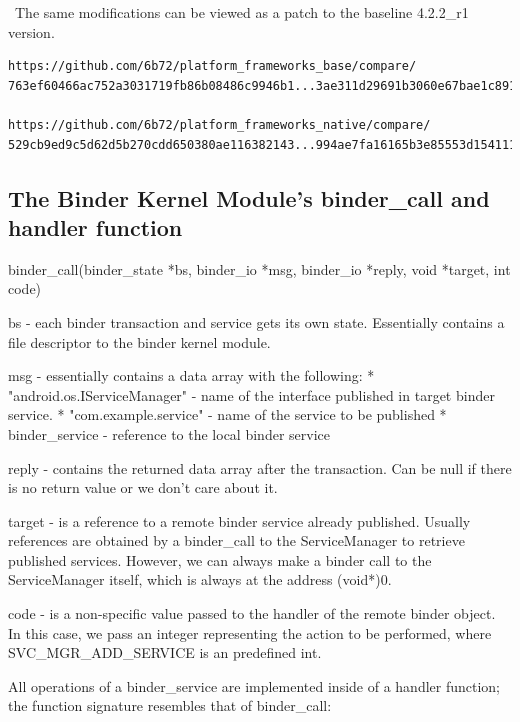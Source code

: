 \documentclass[prodmode]{acmlarge}
\begin{document}
\noindent~The same modifications can be viewed as a patch to the baseline 4.2.2\_r1 version.
\begin{Verbatim}
https://github.com/6b72/platform_frameworks_base/compare/
763ef60466ac752a3031719fb86b08486c9946b1...3ae311d29691b3060e67bae1c891fb8fbbc1be0f

https://github.com/6b72/platform_frameworks_native/compare/
529cb9ed9c5d62d5b270cdd650380ae116382143...994ae7fa16165b3e85553d154111df0a2f5a5af3
\end{Verbatim}

\subsection{The Binder Kernel Module's binder\_call and handler function}
\label{app:binder_call}

\begin{snippet}
binder_call(binder_state *bs, binder_io *msg, binder_io *reply, void *target, int code)

bs -     each binder transaction and service gets its own state.
         Essentially contains a file descriptor to the binder kernel module.

msg -    essentially contains a data array with the following:
         * "android.os.IServiceManager" - name of the interface published in
                                          target binder service.
          * "com.example.service"       - name of the service to be  published
          * binder_service              - reference to the local binder
                                          service

reply -   contains the returned data array after the transaction. Can be null
          if there is no return value or we don't care about it.

target -  is a reference to a remote binder service already published. Usually
          references are obtained by a binder_call to the ServiceManager to retrieve
          published services. However, we can always make a binder call to the
          ServiceManager itself, which is always at the address (void*)0.

code -    is a non-specific value passed to the handler of the remote binder object.
          In this case, we pass an integer representing the action to be performed,
          where SVC_MGR_ADD_SERVICE is an predefined int.
\end{snippet}

All operations of a binder\_service are implemented inside of a handler function; the function signature resembles that of binder\_call:
\end{document}
